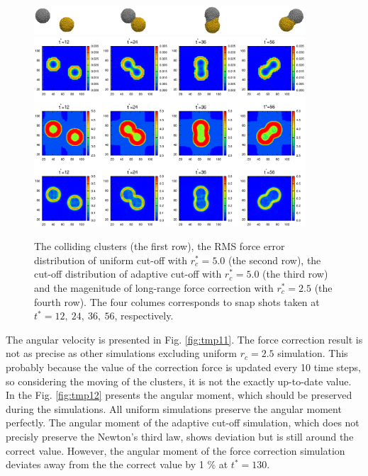 \documentclass[aps,pre,preprint]{revtex4}
\newcommand{\recheck}[1]{{\color{red} #1}}
\begin{document}
\begin{figure}
  \centering
  \includegraphics[width=0.90\textwidth]{fig/error-rcut-ball.eps} 
  \includegraphics[width=0.90\textwidth]{fig/error-rcut.eps}
  \caption{The colliding clusters (the first row), the RMS force error
    distribution of uniform cut-off with $r_c^\ast = 5.0$ (the second
    row), the cut-off distribution of adaptive cut-off with $r_c^\ast
    = 5.0$ (the third row) and the magenitude of long-range force
    correction with $r_c^\ast = 2.5$ (the fourth row). The four
    columes corresponds to snap shots taken at $t^\ast = 12,\ 24,\
    36,\ 56$, respectively.  }
  \label{fig:tmp10}
\end{figure}


The angular velocity is presented in Fig. \ref{fig:tmp11}. The force
correction result is not as precise as other simulations excluding
uniform $r_c = 2.5$ simulation. This probably because the value of the
correction force is updated every 10 time steps, so considering the
moving of the clusters, it is not the exactly up-to-date value.
In the Fig. \ref{fig:tmp12} presents the angular moment, which should be
preserved during the simulations. All uniform simulations
preserve the angular moment perfectly. The angular moment of the
adaptive cut-off simulation, which does not precisly preserve the
Newton's third law, shows deviation but is still around the correct
value. However, the angular moment of the force correction simulation
deviates away from the the correct value by 1 \% at $t^\ast = 130$.
\end{document}
